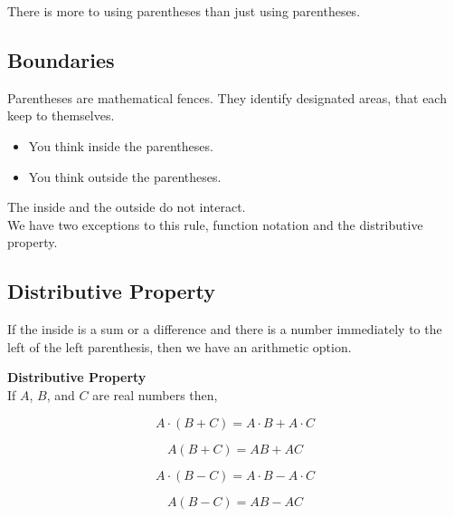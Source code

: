 \documentclass{ximera}
\begin{document}
There is more to using parentheses than just using parentheses. \\



\subsection{Boundaries}


Parentheses are mathematical fences.  They identify designated areas, that each keep to themselves. \\

\begin{itemize}
\item You think inside the parentheses. 
\item You think outside the parentheses. 
\end{itemize}



The inside and the outside do not interact. \\


We have two exceptions to this rule, function notation and the distributive property. \\












\subsection{Distributive Property}


If the inside is a sum or a difference and there is a number immediately to the left of the left parenthesis, then we have an arithmetic option.


\begin{notation}  \textbf{\textcolor{blue!55!black}{Distributive Property}} \\


If $A$, $B$, and $C$ are real numbers then,

\[
A \cdot (B + C) = A \cdot B + A \cdot C
\]


\[
A (B + C) = A  B + A  C
\]


\[
A \cdot (B - C) = A \cdot B - A \cdot C
\]


\[
A (B - C) = A  B - A  C
\]




\end{notation}
\end{document}
